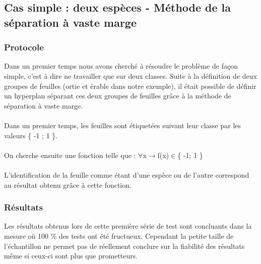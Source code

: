 \subsection{Cas simple : deux espèces - Méthode de la séparation à vaste marge}
\subsubsection{Protocole}
Dans un premier temps nous avons cherché à résoudre le problème de façon simple, c'est à dire ne travailler que sur deux classes.
Suite à la définition de deux groupes de feuilles (ortie et érable dans notre exemple), il était possible de définir un hyperplan séparant ces deux groupes de feuilles grâce à la méthode de séparation à vaste marge.


\paragraph{}
Dans un premier temps, les feuilles sont étiquetées suivant leur classe par les valeurs \{ -1 ; 1 \}. 
\paragraph{}
On cherche ensuite une fonction telle que :
\smallbreak
 $\forall$x$\longrightarrow$f(x)$\in$\{ -1; 1 \}

\paragraph{}
L'identification de la feuille comme étant d'une espèce ou de l'autre correspond au résultat obtenu grâce à cette fonction.

\subsubsection{Résultats}
Les résultats obtenus lors de cette première série de test sont concluants dans la mesure où 100 \% des tests ont été fructueux. Cependant la petite taille de l'échantillon ne permet pas de réellement conclure sur la fiabilité des résultats même si ceux-ci sont plus que prometteurs.